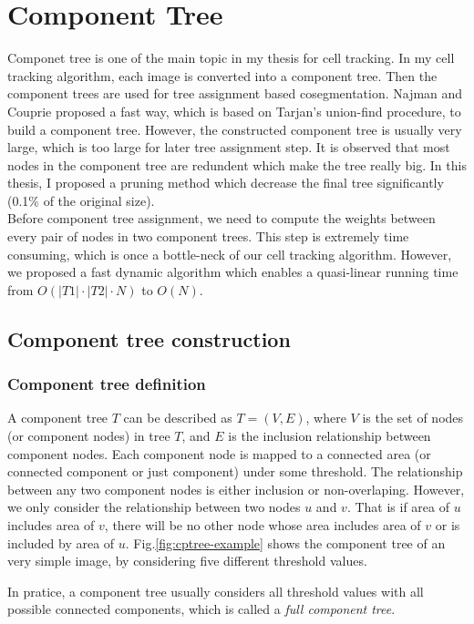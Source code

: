 \chapter{Component Tree}\label{chapter:cptree}
Componet tree is one of the main topic in my thesis for cell tracking. In my cell tracking algorithm, each image is converted into a component tree. Then the component trees are used for tree assignment based cosegmentation. Najman and Couprie \cite{Najman:04,najman2006building} proposed a fast way, which is based on Tarjan's union-find procedure, to build a component tree. However, the constructed component tree is usually very large, which is too large for later tree assignment step. It is observed that most nodes in the component tree are redundent which make the tree really big. In this thesis, I proposed a pruning method which decrease the final tree significantly (0.1\% of the original size).\\
Before component tree assignment, we need to compute the weights between every pair of nodes in two component trees. This step is extremely time consuming, which is once a bottle-neck of our cell tracking algorithm. However, we proposed a fast dynamic algorithm which enables a quasi-linear running time from $O(|T1|\cdot|T2|\cdot N)$ to $O(N)$.
\section{Component tree construction}
\subsection{Component tree definition}
A component tree $T$ can be described as $T=(V, E)$, where $V$ is the set of nodes (or component nodes) in tree $T$, and $E$ is the inclusion relationship between component nodes. Each component node is mapped to a connected area (or connected component or just component) under some threshold. The relationship between any two component nodes is either inclusion or non-overlaping. However, we only consider the relationship between two nodes $u$ and $v$. That is if area of $u$ includes area of $v$, there will be no other node whose area includes area of $v$ or is included by area of $u$. Fig.\ref{fig:cptree-example} shows the component tree of an very simple image, by considering five different threshold values.

In pratice, a component tree usually considers all threshold values with all possible connected components, which is called a \emph{full component tree}.

